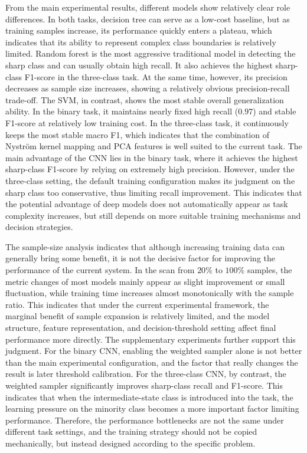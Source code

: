 \par From the main experimental results, different models show relatively clear
role differences. In both tasks, decision tree can serve as a low-cost
baseline, but as training samples increase, its performance quickly enters a
plateau, which indicates that its ability to represent complex class
boundaries is relatively limited. Random forest is the most aggressive
traditional model in detecting the sharp class and can usually obtain high
recall. It also achieves the highest sharp-class F1-score in the three-class
task. At the same time, however, its precision decreases as sample size
increases, showing a relatively obvious precision-recall trade-off. The SVM,
in contrast, shows the most stable overall generalization ability. In the
binary task, it maintains nearly fixed high recall ($0.97$) and stable
F1-score at relatively low training cost. In the three-class task, it
continuously keeps the most stable macro F1, which indicates that the
combination of Nystr\"{o}m kernel mapping and PCA features is well suited to
the current task. The main advantage of the CNN lies in the binary task, where
it achieves the highest sharp-class F1-score by relying on extremely high
precision. However, under the three-class setting, the default training
configuration makes its judgment on the sharp class too conservative, thus
limiting recall improvement. This indicates that the potential advantage of
deep models does not automatically appear as task complexity increases, but
still depends on more suitable training mechanisms and decision strategies.

\par The sample-size analysis indicates that although increasing training data
can generally bring some benefit, it is not the decisive factor for improving
the performance of the current system. In the scan from $20\%$ to $100\%$
samples, the metric changes of most models mainly appear as slight improvement
or small fluctuation, while training time increases almost monotonically with
the sample ratio. This indicates that under the current experimental
framework, the marginal benefit of sample expansion is relatively limited, and
the model structure, feature representation, and decision-threshold setting
affect final performance more directly. The supplementary experiments further
support this judgment. For the binary CNN, enabling the weighted sampler alone
is not better than the main experimental configuration, and the factor that
really changes the result is later threshold calibration. For the three-class
CNN, by contrast, the weighted sampler significantly improves sharp-class
recall and F1-score. This indicates that when the intermediate-state class is
introduced into the task, the learning pressure on the minority class becomes a
more important factor limiting performance. Therefore, the performance
bottlenecks are not the same under different task settings, and the training
strategy should not be copied mechanically, but instead designed according to
the specific problem.

